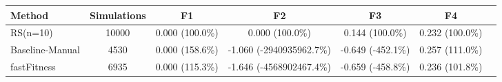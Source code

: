 \begin{tabular}{lcccccc}
\toprule
         Method &  Simulations &              F1 &                       F2 &                F3 &              F4 \\
\midrule
       RS(n=10) &        10000 & 0.000 (100.0\%) &          0.000 (100.0\%) &   0.144 (100.0\%) & 0.232 (100.0\%) \\
Baseline-Manual &         4530 & 0.000 (158.6\%) & -1.060 (-2940935962.7\%) & -0.649 (-452.1\%) & 0.257 (111.0\%) \\
    fastFitness &         6935 & 0.000 (115.3\%) & -1.646 (-4568902467.4\%) & -0.659 (-458.8\%) & 0.236 (101.8\%) \\
\bottomrule
\end{tabular}
